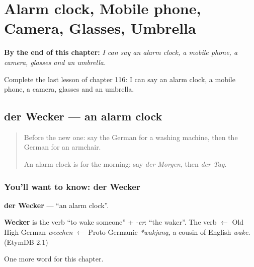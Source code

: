 
\chapter{Alarm clock, Mobile phone, Camera, Glasses, Umbrella}
\label{ch:ge-alarm-clock-mobile-phone-camera-glasses-umbrella}

\begin{chapteropening}
\textbf{By the end of this chapter:} \emph{I can say an alarm clock, a mobile phone, a camera, glasses and an umbrella.}

Complete the last lesson of chapter 116: I can say an alarm clock, a mobile phone, a camera, glasses and an umbrella.
\end{chapteropening}

\section[der Wecker]{der Wecker — an alarm clock}

\label{lesson:GE-C116-wecker}



\begin{quote}
Before the new one: say the German for a washing machine, then the German for an armchair.

An alarm clock is for the morning: say \emph{der Morgen}, then \emph{der Tag}.
\end{quote}

\subsection*{You'll want to know: der Wecker}
\textbf{der Wecker} — \textquotedblleft{}an alarm clock\textquotedblright{}.

\begin{cousinweb}
\textbf{Wecker} is the verb \textquotedblleft{}to wake someone\textquotedblright{} + \emph{-er}: \textquotedblleft{}the waker\textquotedblright{}. The verb $\leftarrow$ Old High German \emph{wecchen} $\leftarrow$ Proto-Germanic \emph{*wakjaną}, a cousin of English \emph{wake}. (EtymDB 2.1)
\end{cousinweb}

\begin{grammarlens}[title={What you've built}]
One more word for this chapter.
\end{grammarlens}


